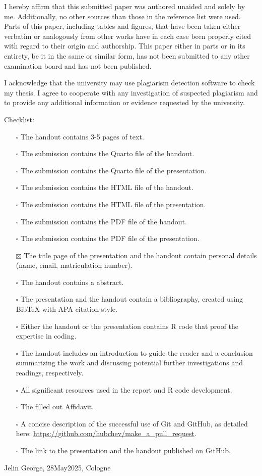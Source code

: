 \documentclass[
  man,
  floatsintext,
  longtable,
  nolmodern,
  notxfonts,
  notimes,
  colorlinks=true,linkcolor=blue,citecolor=blue,urlcolor=blue]{apa7}
\providecommand{\tightlist}{%
  \setlength{\itemsep}{0pt}\setlength{\parskip}{0pt}}
\begin{document}
I hereby affirm that this submitted paper was authored unaided and
solely by me. Additionally, no other sources than those in the reference
list were used. Parts of this paper, including tables and figures, that
have been taken either verbatim or analogously from other works have in
each case been properly cited with regard to their origin and
authorship. This paper either in parts or in its entirety, be it in the
same or similar form, has not been submitted to any other examination
board and has not been published.

I acknowledge that the university may use plagiarism detection software
to check my thesis. I agree to cooperate with any investigation of
suspected plagiarism and to provide any additional information or
evidence requested by the university.

Checklist:

\begin{itemize}
\tightlist
\item[$\square$]
  The handout contains 3-5 pages of text.
\item[$\square$]
  The submission contains the Quarto file of the handout.
\item[$\square$]
  The submission contains the Quarto file of the presentation.
\item[$\square$]
  The submission contains the HTML file of the handout.
\item[$\square$]
  The submission contains the HTML file of the presentation.
\item[$\square$]
  The submission contains the PDF file of the handout.
\item[$\square$]
  The submission contains the PDF file of the presentation.
\item[$\boxtimes$]
  The title page of the presentation and the handout contain personal
  details (name, email, matriculation number).
\item[$\square$]
  The handout contains a abstract.
\item[$\square$]
  The presentation and the handout contain a bibliography, created using
  BibTeX with APA citation style.
\item[$\square$]
  Either the handout or the presentation contains R code that proof the
  expertise in coding.
\item[$\square$]
  The handout includes an introduction to guide the reader and a
  conclusion summarizing the work and discussing potential further
  investigations and readings, respectively.
\item[$\square$]
  All significant resources used in the report and R code development.
\item[$\square$]
  The filled out Affidavit.
\item[$\square$]
  A concise description of the successful use of Git and GitHub, as
  detailed here: \url{https://github.com/hubchev/make_a_pull_request}.
\item[$\square$]
  The link to the presentation and the handout published on GitHub.
\end{itemize}

Jelin George, 28May2025, Cologne
\end{document}
